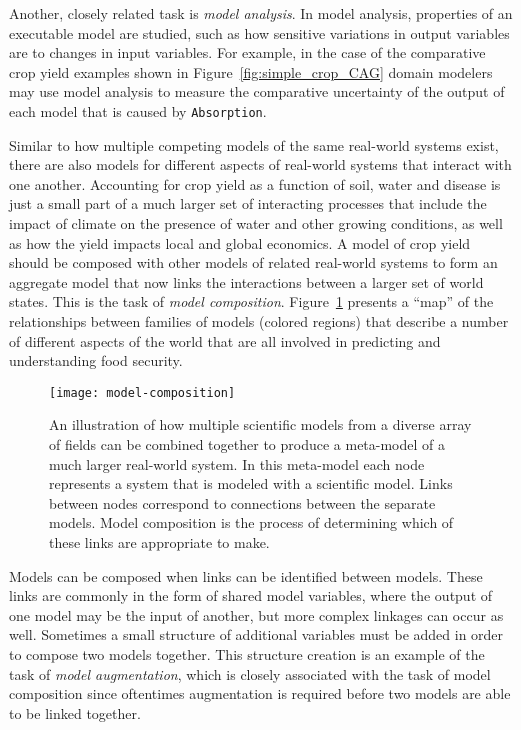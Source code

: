 Another, closely related task is \emph{model analysis}.
In model analysis, properties of an executable model are studied, such as how sensitive variations in output variables are to changes in input variables.
For example, in the case of the comparative crop yield examples shown in Figure~\ref{fig:simple_crop_CAG} domain modelers may use model analysis to measure the comparative uncertainty of the output of each model that is caused by {\tt Absorption}.

Similar to how multiple competing models of the same real-world systems exist, there are also models for different aspects of real-world systems that interact with one another.
Accounting for crop yield as a function of soil, water and disease is just a small part of a much larger set of interacting processes that include the impact of climate on the presence of water and other growing conditions, as well as how the yield impacts local and global economics. A model of crop yield should be composed with other models of related real-world systems to form an aggregate model that now links the interactions between a larger set of world states.
This is the task of \textit{model composition}.
Figure~\ref{fig:composition_example} presents a ``map'' of the relationships between families of models (colored regions) that describe a number of different aspects of the world that are all involved in predicting and understanding food security.

\begin{figure}[!htbp]
  \centering
  \texttt{[image: model-composition]}
  \caption[Model Composition Web]{An illustration of how multiple scientific models from a diverse array of fields can be combined together to produce a meta-model of a much larger real-world system. In this meta-model each node represents a system that is modeled with a scientific model. Links between nodes correspond to connections between the separate models. Model composition is the process of determining which of these links are appropriate to make.}
  \label{fig:composition_example}
\end{figure}

Models can be composed when links can be identified between models.
These links are commonly in the form of shared model variables, where the output of one model may be the input of another, but more complex linkages can occur as well.
Sometimes a small structure of additional variables must be added in order to compose two models together.
This structure creation is an example of the task of \textit{model augmentation}, which is closely associated with the task of model composition since oftentimes augmentation is required before two models are able to be linked together.

